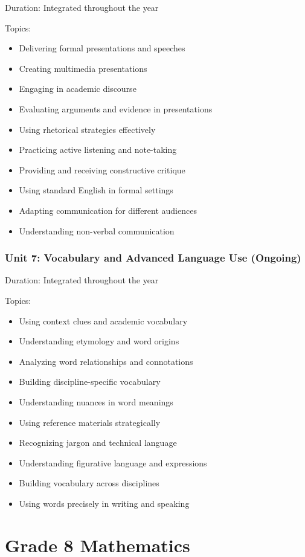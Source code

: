 \documentclass[11pt,letterpaper]{report}
\begin{document}
Duration: Integrated throughout the year

Topics:
\begin{itemize}
\item Delivering formal presentations and speeches
\item Creating multimedia presentations
\item Engaging in academic discourse
\item Evaluating arguments and evidence in presentations
\item Using rhetorical strategies effectively
\item Practicing active listening and note-taking
\item Providing and receiving constructive critique
\item Using standard English in formal settings
\item Adapting communication for different audiences
\item Understanding non-verbal communication
\end{itemize}

\subsection{Unit 7: Vocabulary and Advanced Language Use (Ongoing)}

Duration: Integrated throughout the year

Topics:
\begin{itemize}
\item Using context clues and academic vocabulary
\item Understanding etymology and word origins
\item Analyzing word relationships and connotations
\item Building discipline-specific vocabulary
\item Understanding nuances in word meanings
\item Using reference materials strategically
\item Recognizing jargon and technical language
\item Understanding figurative language and expressions
\item Building vocabulary across disciplines
\item Using words precisely in writing and speaking
\end{itemize}

\chapter{Grade 8 Mathematics}
\end{document}
